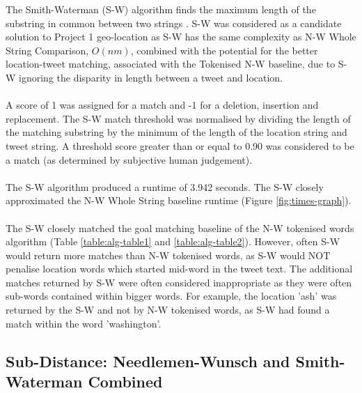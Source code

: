 \documentclass[11pt,a4paper]{article}
\begin{document}
The Smith-Waterman (S-W) algorithm finds the maximum length of the substring in common between two strings \citep{sf-sw}. S-W was considered as a candidate solution to Project 1 geo-location as S-W has the same complexity as N-W Whole String Comparison, $O(nm)$\cite{go-sw}, combined with the potential for the better location-tweet matching, associated with the Tokenised N-W baseline, due to  S-W ignoring the disparity in length between a tweet and location.\\\\
A score of 1 was assigned for a match and -1 for a deletion, insertion and replacement. The S-W match threshold was normalised by dividing the length of the matching substring by the minimum of the length of the location string and tweet string. A threshold score greater than or equal to 0.90 was considered to be a match (as determined by subjective human judgement).\\\\
The S-W algorithm produced a runtime of 3.942 seconds. The S-W closely approximated the N-W Whole String baseline runtime (Figure \ref{fig:times-graph}).\\\\      
The S-W closely matched the goal matching baseline of the N-W tokenised words algorithm (Table \ref{table:alg-table1} and \ref{table:alg-table2}). However, often S-W would return more matches than N-W tokenised words, as S-W would NOT penalise location words which started mid-word in the tweet text. The additional matches returned by S-W were often considered inappropriate as they were often sub-words contained within bigger words. For example, the location 'ash' was returned by the S-W and not by N-W tokenised words, as S-W had found a match within the word 'washington'.    

\subsection{Sub-Distance: Needlemen-Wunsch and Smith-Waterman Combined}
\end{document}
